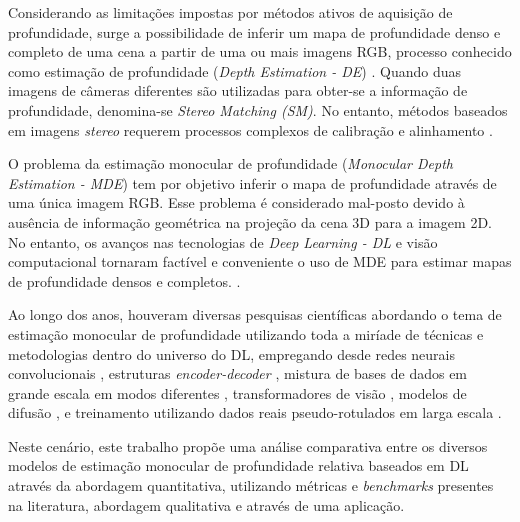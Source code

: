 


Considerando as limitações impostas por métodos ativos de aquisição de profundidade, surge a possibilidade de inferir um mapa de profundidade denso e completo de uma cena a partir de uma ou mais imagens RGB, processo conhecido como estimação de profundidade (\textit{Depth Estimation - DE}) \cite{rajapaksha2024deep}. Quando duas imagens de câmeras diferentes são utilizadas para obter-se a informação de profundidade, denomina-se \textit{Stereo Matching (SM)}. No entanto, métodos baseados em imagens \textit{stereo} requerem processos complexos de calibração e alinhamento \cite{dong2022towards}.


O problema da estimação monocular de profundidade (\textit{Monocular Depth Estimation - MDE}) tem por objetivo inferir o mapa de profundidade através de uma única imagem RGB. Esse problema é considerado mal-posto devido à ausência de informação geométrica na projeção da cena 3D para a imagem 2D. No entanto, os avanços nas tecnologias de \textit{Deep Learning - DL} e visão computacional tornaram factível e conveniente o uso de MDE para estimar mapas de profundidade densos e completos. \cite{spencer2024third} \cite{rajapaksha2024deep}. 

Ao longo dos anos, houveram diversas pesquisas científicas abordando o tema de estimação monocular de profundidade utilizando toda a miríade de técnicas e metodologias dentro do universo do DL, empregando desde redes neurais convolucionais \cite{kopf2021robust}, estruturas \textit{encoder-decoder} \cite{godard2019digging}, mistura de bases de dados em grande escala em modos diferentes \cite{lasinger2019towards}, transformadores de visão \cite{birkl2023midas}, modelos de difusão \cite{ke2024repurposing}, e treinamento utilizando dados reais pseudo-rotulados em larga escala \cite{yang2024depth}. 

Neste cenário, este trabalho propõe uma análise comparativa entre os diversos modelos de estimação monocular de profundidade relativa baseados em DL através da abordagem quantitativa, utilizando métricas e \textit{benchmarks} presentes na literatura, abordagem qualitativa e através de uma aplicação.



